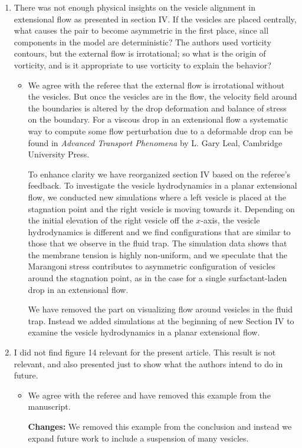 \documentclass[11pt]{article}
\newcommand{\comment}[1]{{\color{blue} #1}}
\begin{document}
\begin{enumerate}
\noindent
\item\comment{There was not enough physical insights on the vesicle
  alignment in extensional flow as presented in section IV. If the
  vesicles are placed centrally, what causes the pair to become
  asymmetric in the first place, since all components in the model are
  deterministic? The authors used vorticity contours, but the external
  flow is irrotational; so what is the origin of vorticity, and is it
  appropriate to use vorticity to explain the behavior?}
\begin{itemize}
  \item We agree with the referee that the external flow is irrotational without the
    vesicles. But once the vesicles are in the flow, the velocity field around the boundaries
    is altered by the drop deformation and balance of stress on the boundary. 
    For a viscous drop in an extensional flow a systematic way to compute some 
    flow perturbation due to a deformable drop can be found in {\it Advanced Transport Phenomena} 
    by L. Gary Leal, Cambridge University Press.
   
    
    To enhance clarity we have reorganized section IV based on the referee's feedback.
    To investigate the vesicle hydrodynamics in a planar extensional
    flow, we conducted new simulations where a left vesicle is placed at
    the stagnation point and the right vesicle is moving towards it.
    Depending on the initial elevation of the right vesicle off the
    $x$-axis, the vesicle hydrodynamics is different and we find
    configurations that are similar to those that we observe in the
    fluid trap. The simulation data shows that the membrane tension is
    highly non-uniform, and we speculate that the Marangoni stress
    contributes to asymmetric configuration of vesicles around the
    stagnation point, as in the case for a single surfactant-laden drop in an
    extensional flow. 
    
    
   
  
   We have removed the part on visualizing flow
    around vesicles in the fluid trap. Instead we added simulations at
    the beginning of new Section IV to examine the vesicle hydrodynamics
    in a planar extensional flow.
\end{itemize}

\noindent
\item\comment{I did not find figure 14 relevant for the present article.
  This result is not relevant, and also presented just to show what the
  authors intend to do in future.}
\begin{itemize}
  \item We agree with the referee and  have removed this example from
    the manuscript.
    
    \noindent
    {\bf Changes:} We removed this example from the conclusion and
    instead we expand future work to include a suspension of many
    vesicles.
\end{itemize}

\end{enumerate}
\end{document}
